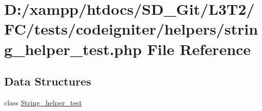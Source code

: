 \hypertarget{string__helper__test_8php}{}\section{D\+:/xampp/htdocs/\+S\+D\+\_\+\+Git/\+L3\+T2/\+F\+C/tests/codeigniter/helpers/string\+\_\+helper\+\_\+test.php File Reference}
\label{string__helper__test_8php}
\subsection*{Data Structures}
\begin{DoxyCompactItemize}
\item 
class \hyperlink{class_string__helper__test}{String\+\_\+helper\+\_\+test}
\end{DoxyCompactItemize}

